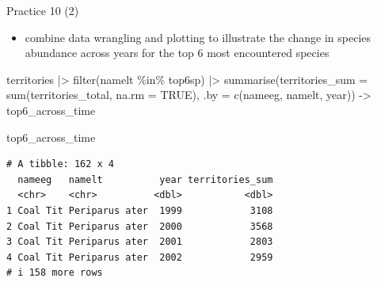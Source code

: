 \documentclass[
  ignorenonframetext,
  aspectratio=169,
  t]{beamer}
\newenvironment{Shaded}{\begin{snugshade}}{\end{snugshade}}
\newcommand{\AttributeTok}[1]{\textcolor[rgb]{0.40,0.45,0.13}{#1}}
\newcommand{\ConstantTok}[1]{\textcolor[rgb]{0.56,0.35,0.01}{#1}}
\newcommand{\FunctionTok}[1]{\textcolor[rgb]{0.28,0.35,0.67}{#1}}
\newcommand{\NormalTok}[1]{\textcolor[rgb]{0.00,0.23,0.31}{#1}}
\newcommand{\OtherTok}[1]{\textcolor[rgb]{0.00,0.23,0.31}{#1}}
\newcommand{\SpecialCharTok}[1]{\textcolor[rgb]{0.37,0.37,0.37}{#1}}
\providecommand{\tightlist}{%
  \setlength{\itemsep}{0pt}\setlength{\parskip}{0pt}}
\begin{document}
\begin{frame}[fragile]{Practice 10 (2)}
\protect{}\label{practice-10-2}
\begin{itemize}
\tightlist
\item
  combine data wrangling and plotting to illustrate the change in
  species abundance across years for the top 6 most encountered species
\end{itemize}

\footnotesize

\begin{Shaded}
\begin{Highlighting}[]
\NormalTok{territories }\SpecialCharTok{|\textgreater{}} 
    \FunctionTok{filter}\NormalTok{(namelt }\SpecialCharTok{\%in\%}\NormalTok{ top6sp) }\SpecialCharTok{|\textgreater{}} 
    \FunctionTok{summarise}\NormalTok{(}\AttributeTok{territories\_sum =} \FunctionTok{sum}\NormalTok{(territories\_total, }\AttributeTok{na.rm =} \ConstantTok{TRUE}\NormalTok{),}
              \AttributeTok{.by =} \FunctionTok{c}\NormalTok{(nameeg, namelt, year)) }\OtherTok{{-}\textgreater{}}\NormalTok{ top6\_across\_time}

\NormalTok{top6\_across\_time}
\end{Highlighting}
\end{Shaded}

\begin{verbatim}
# A tibble: 162 x 4
  nameeg   namelt          year territories_sum
  <chr>    <chr>          <dbl>           <dbl>
1 Coal Tit Periparus ater  1999            3108
2 Coal Tit Periparus ater  2000            3568
3 Coal Tit Periparus ater  2001            2803
4 Coal Tit Periparus ater  2002            2959
# i 158 more rows
\end{verbatim}

\normalsize
\end{frame}
\end{document}
